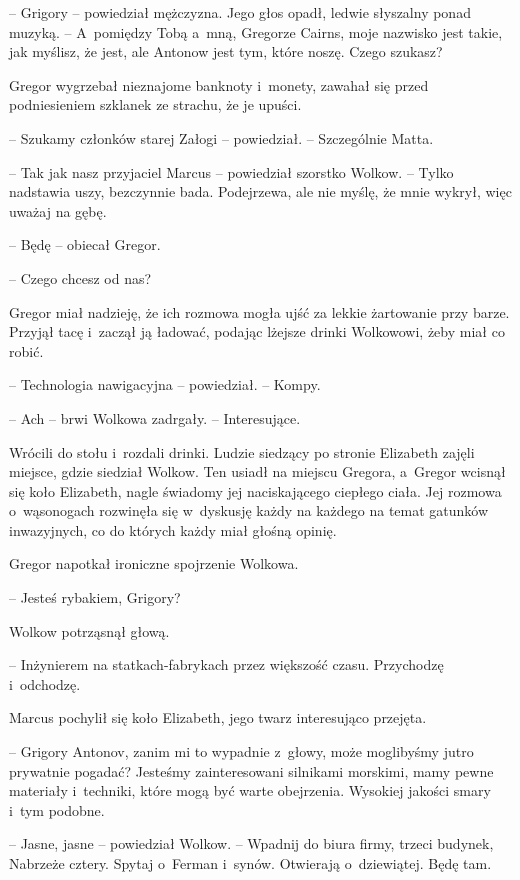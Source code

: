 \documentclass[oneside,polish,12pt,sfheadings]{mwbk}
\begin{document}
-- Grigory -- powiedział mężczyzna. Jego głos opadł, ledwie słyszalny
ponad muzyką. -- A~pomiędzy Tobą a~mną, Gregorze Cairns, moje nazwisko
jest takie, jak myślisz, że jest, ale Antonow jest tym, które noszę.
Czego szukasz?

Gregor wygrzebał nieznajome banknoty i~monety, zawahał się przed
podniesieniem szklanek ze strachu, że je upuści.

-- Szukamy członków starej Załogi -- powiedział. -- Szczególnie Matta.

-- Tak jak nasz przyjaciel Marcus -- powiedział szorstko Wolkow. -- Tylko
nadstawia uszy, bezczynnie bada. Podejrzewa, ale nie myślę, że mnie
wykrył, więc uważaj na gębę.

-- Będę -- obiecał Gregor.

-- Czego chcesz od nas?

Gregor miał nadzieję, że ich rozmowa mogła ujść za lekkie żartowanie
przy barze. Przyjął tacę i~zaczął ją ładować, podając lżejsze drinki
Wolkowowi, żeby miał co robić.

-- Technologia nawigacyjna -- powiedział. -- Kompy.

-- Ach -- brwi Wolkowa zadrgały. -- Interesujące.

Wrócili do stołu i~rozdali drinki. Ludzie siedzący po stronie Elizabeth
zajęli miejsce, gdzie siedział Wolkow. Ten usiadł na miejscu Gregora, a~Gregor wcisnął się koło Elizabeth, nagle świadomy jej naciskającego
ciepłego ciała. Jej rozmowa o~wąsonogach rozwinęła się w~dyskusję każdy
na każdego na temat gatunków inwazyjnych, co do których każdy miał
głośną opinię.

Gregor napotkał ironiczne spojrzenie Wolkowa.

-- Jesteś rybakiem, Grigory?

Wolkow potrząsnął głową. 

-- Inżynierem na statkach-fabrykach przez
większość czasu. Przychodzę i~odchodzę.

Marcus pochylił się koło Elizabeth, jego twarz interesująco przejęta.

-- Grigory Antonov, zanim mi to wypadnie z~głowy, może moglibyśmy jutro
prywatnie pogadać? Jesteśmy zainteresowani silnikami morskimi, mamy
pewne materiały i~techniki, które mogą być warte obejrzenia. Wysokiej
jakości smary i~tym podobne.

-- Jasne, jasne -- powiedział Wolkow. -- Wpadnij do biura firmy, trzeci
budynek, Nabrzeże cztery. Spytaj o~Ferman i~synów. Otwierają o~dziewiątej. Będę tam.
\end{document}
